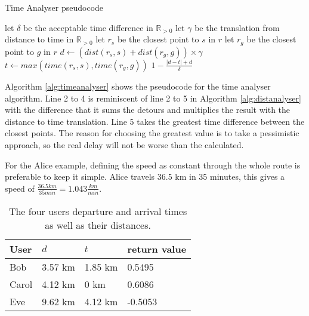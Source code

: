 \begin{algorithm}
	\caption{Time Analyser pseudocode}
	\label{alg:timeanalyser}
	\begin{algorithmic}[1]
		\Require 
		\Statex let $\delta$ be the acceptable time difference in $\mathbb{R}_{>0}$
		\Statex let $\gamma$ be the translation from distance to time in $\mathbb{R}_{>0}$ 
		\Statex 
			\State let $r_s$ be the closest point to $s$ in $r$
			\State let $r_g$ be the closest point to $g$ in $r$
			\State $d \gets (dist(r_s,s) + dist(r_g,g))\times\gamma$
			\State $t \gets max(time(r_s, s), time(r_g, g))$
			\State\Return $1-\frac{|d - t| + d}{\delta}$
		\EndFunction
	\end{algorithmic}
\end{algorithm}

Algorithm \ref{alg:timeanalyser} shows the pseudocode for the time analyser algorithm.
Line 2 to 4 is reminiscent of line 2 to 5 in Algorithm \ref{alg:distanalyser} with the difference that it sums the detours and multiplies the result with the distance to time translation.
Line 5 takes the greatest time difference between the closest points.
The reason for choosing the greatest value is to take a pessimistic approach, so the real delay will not be worse than the calculated.

For the Alice example, defining the speed as constant through the whole route is preferable to keep it simple.
Alice travels 36.5 km in 35 minutes, this gives a speed of  $\frac{36.5 km}{35 min} = 1.043 \frac{km}{min} $.

\begin{table}[!ht]
\centering
\begin{tabular}{@{}llll@{}}
\toprule
\textbf{User} 	& \textbf{$d$} & \textbf{$t$} 	& \textbf{return value} 	\\ \midrule
Bob         	& 3.57 km        & 1.85 km	    	& 0.5495 			\\
Carol         	& 4.12 km        & 0 km       		& 0.6086        		\\
Eve           	& 9.62 km        & 4.12 km		    & -0.5053        		\\ \bottomrule
\end{tabular}
\caption{The four users departure and arrival times as well as their distances.}
\label{tbl:time}
\end{table}


